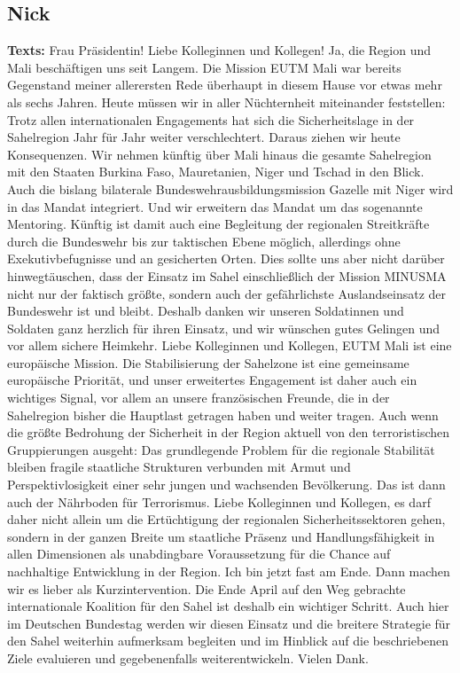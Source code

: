 \documentclass{article}
\begin{document}
\subsection{Nick}
\noindent\textbf{Texts:} Frau Präsidentin! Liebe Kolleginnen und Kollegen! Ja, die Region und Mali beschäftigen uns seit Langem. Die Mission EUTM Mali war bereits Gegenstand meiner allerersten Rede überhaupt in diesem Hause vor etwas mehr als sechs Jahren. Heute müssen wir in aller Nüchternheit miteinander feststellen: Trotz allen internationalen Engagements hat sich die Sicherheitslage in der Sahelregion Jahr für Jahr weiter verschlechtert. Daraus ziehen wir heute Konsequenzen. Wir nehmen künftig über Mali hinaus die gesamte Sahelregion mit den Staaten Burkina Faso, Mauretanien, Niger und Tschad in den Blick. Auch die bislang bilaterale Bundeswehrausbildungsmission Gazelle mit Niger wird in das Mandat integriert. Und wir erweitern das Mandat um das sogenannte Mentoring. Künftig ist damit auch eine Begleitung der regionalen Streitkräfte durch die Bundeswehr bis zur taktischen Ebene möglich, allerdings ohne Exekutivbefugnisse und an gesicherten Orten. Dies sollte uns aber nicht darüber hinwegtäuschen, dass der Einsatz im Sahel einschließlich der Mission MINUSMA nicht nur der faktisch größte, sondern auch der gefährlichste Auslandseinsatz der Bundeswehr ist und bleibt. Deshalb danken wir unseren Soldatinnen und Soldaten ganz herzlich für ihren Einsatz, und wir wünschen gutes Gelingen und vor allem sichere Heimkehr.  Liebe Kolleginnen und Kollegen, EUTM Mali ist eine europäische Mission. Die Stabilisierung der Sahelzone ist eine gemeinsame europäische Priorität, und unser erweitertes Engagement ist daher auch ein wichtiges Signal, vor allem an unsere französischen Freunde, die in der Sahelregion bisher die Hauptlast getragen haben und weiter tragen. Auch wenn die größte Bedrohung der Sicherheit in der Region aktuell von den terroristischen Gruppierungen ausgeht: Das grundlegende Problem für die regionale Stabilität bleiben fragile staatliche Strukturen verbunden mit Armut und Perspektivlosigkeit einer sehr jungen und wachsenden Bevölkerung. Das ist dann auch der Nährboden für Terrorismus. Liebe Kolleginnen und Kollegen, es darf daher nicht allein um die Ertüchtigung der regionalen Sicherheitssektoren gehen, sondern in der ganzen Breite um staatliche Präsenz und Handlungsfähigkeit in allen Dimensionen als unabdingbare Voraussetzung für die Chance auf nachhaltige Entwicklung in der Region.  Ich bin jetzt fast am Ende.  Dann machen wir es lieber als Kurzintervention.  Die Ende April auf den Weg gebrachte internationale Koalition für den Sahel ist deshalb ein wichtiger Schritt. Auch hier im Deutschen Bundestag werden wir diesen Einsatz und die breitere Strategie für den Sahel weiterhin aufmerksam begleiten und im Hinblick auf die beschriebenen Ziele evaluieren und gegebenenfalls weiterentwickeln. Vielen Dank.  
\end{document}
